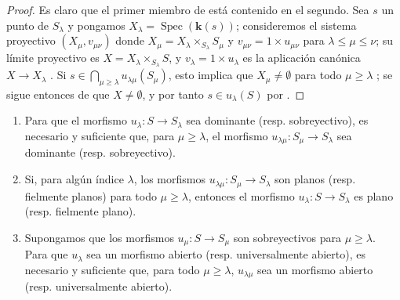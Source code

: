 \begin{proof}
Es claro que el primer miembro de  está contenido en el segundo.
Sea $s$ un punto de $S_\lambda$ y pongamos $X_\lambda=\operatorname{Spec}(\boldsymbol{k}(s))$; consideremos el sistema proyectivo $(X_\mu,v_{\mu\nu})$ donde $X_\mu=X_\lambda\times_{S_\lambda}S_\mu$ y $v_{\mu\nu}=1\times u_{\mu\nu}$ para $\lambda\leq\mu\leq\nu$; su límite proyectivo es $X=X_\lambda\times_{S_\lambda}S$, y $v_\lambda=1\times u_\lambda$ es la aplicación canónica $X\to X_\lambda$ .
Si $s\in\bigcap_{\mu\geq\lambda}u_{\lambda\mu}(S_\mu)$, esto implica que $X_\mu\neq\emptyset$ para todo $\mu\geq\lambda$ ; se sigue entonces de  que $X\neq\emptyset$, y por tanto $s\in u_\lambda(S)$ por .
\end{proof}

\begin{proposition}[8.3.8]
\label{IV.8.3.8-fr}
\begin{enumerate}[label=\textup{(\roman*)}]
   \item Para que el morfismo $u_\lambda:S\to S_\lambda$ sea dominante \textup{(resp.} sobreyectivo\textup{)}, es necesario y suficiente que, para $\mu\geq\lambda$, el morfismo $u_{\lambda\mu}:S_\mu\to S_\lambda$ sea dominante \textup{(resp.} sobreyectivo\textup{)}.
   \item Si, para algún índice $\lambda$, los morfismos $u_{\lambda\mu}:S_\mu\to S_\lambda$ son planos \textup{(resp.} fielmente planos\textup{)} para todo $\mu\geq\lambda$, entonces el morfismo $u_\lambda:S\to S_\lambda$ es plano \textup{(resp.} fielmente plano\textup{)}.
   \item Supongamos que los morfismos $u_\mu:S\to S_\mu$ son sobreyectivos para $\mu\geq\lambda$.
Para que $u_\lambda$ sea un morfismo abierto \textup{(resp.} universalmente abierto\textup{)}, es necesario y suficiente que, para todo $\mu\geq\lambda$, $u_{\lambda\mu}$ sea un morfismo abierto \textup{(resp.} universalmente abierto\textup{)}.
\end{enumerate}
\end{proposition}

